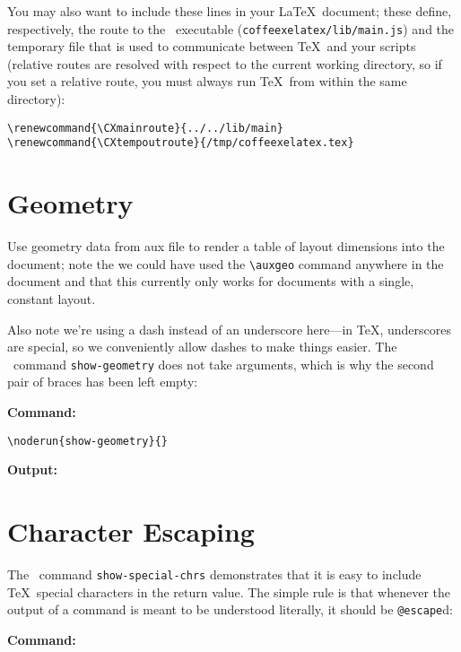 \documentclass[a5paper]{article}
\makeatletter
\newenvironment{jzrplain}{%
  \lineskiplimit=-10pt%
  \lineskip=0pt%
  \topskip=0pt%
  \setlength{\parindent}{0mm}%
  \leading{4mm}
  }%
  {\par}
\renewcommand{\CXmainroute}{../../lib/main}
\renewcommand{\CXtempoutroute}{/tmp/CXtempout.tex}
\makeatother
\begin{document}
\begin{jzrplain}
You may also want to include these lines in your \LaTeX\ document; these define, respectively, the route
to the \CX\ executable (\verb#coffeexelatex/lib/main.js#) and the temporary file that is used to communicate
between \TeX\ and your scripts (relative routes are resolved with respect to the current working directory,
so if you set a relative route, you must always run \TeX\ from within the same directory):
\begin{verbatim}
\renewcommand{\CXmainroute}{../../lib/main}
\renewcommand{\CXtempoutroute}{/tmp/coffeexelatex.tex}
\end{verbatim}


\clearpage
\section{Geometry}\label{geo}


\auxgeo

Use geometry data from aux file to render a table of layout dimensions into the document;
note the we could have used the \verb#\auxgeo# command anywhere in the document and that
this currently only works for documents with a single, constant layout.

Also note we're using a dash instead of an underscore here—in \TeX, underscores are special, so
we conveniently allow dashes to make things easier. The \CX\ command \verb#show-geometry# does
not take arguments, which is why the second pair of braces has been left empty:

{\textbf{Command:}}
\begin{verbatim}
\noderun{show-geometry}{}
\end{verbatim}

{\textbf{Output:}}


\clearpage
\section{Character Escaping}\label{esc}
The \CX\ command \verb#show-special-chrs# demonstrates that it is easy to include \TeX\ special characters
in the return value. The simple rule is that whenever the output of a command is meant to be understood
literally, it should be \verb#@escape#d:

{\textbf{Command:}}


\end{jzrplain}
\end{document}
